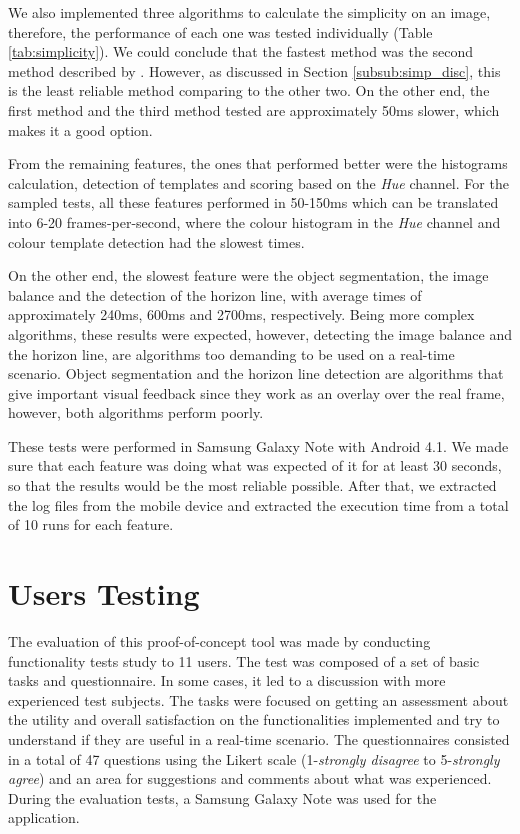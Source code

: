 We also implemented three algorithms to calculate the simplicity on an image, therefore, the performance of each one was tested individually (Table \ref{tab:simplicity}). We could conclude that the fastest method was the second method described by \citeauthor{kaoautomatic} \cite{kaoautomatic}. However, as discussed in Section \ref{subsub:simp_disc}, this is the least reliable method comparing to the other two. On the other end, the first method \cite{luo2008photo} and the third method \cite{ke2006design} tested are approximately 50ms slower, which makes it a good option.

From the remaining features, the ones that performed better were the histograms calculation, detection of templates and scoring based on the \emph{Hue} channel. For the sampled tests, all these features performed in 50-150ms which can be translated into 6-20 frames-per-second, where the colour histogram in the \emph{Hue} channel and colour template detection had the slowest times. 

On the other end, the slowest feature were the object segmentation, the image balance and the detection of the horizon line, with average times of approximately 240ms, 600ms and 2700ms, respectively. Being more complex algorithms, these results were expected, however, detecting the image balance and the horizon line, are algorithms too demanding to be used on a real-time scenario. Object segmentation and the horizon line detection are algorithms that give important visual feedback since they work as an overlay over the real frame, however, both algorithms perform poorly.

These tests were performed in Samsung Galaxy Note with Android 4.1. We made sure that each feature was doing what was expected of it for at least 30 seconds, so that the results would be the most reliable possible. After that, we extracted the log files from the mobile device and extracted the execution time from a total of 10 runs for each feature.
 
\section{Users Testing}

The evaluation of this proof-of-concept tool was made by conducting functionality tests study to 11 users. The test was composed of a set of basic tasks and questionnaire. In some cases, it led to a discussion with more experienced test subjects. The tasks were focused on getting an assessment about the utility and overall satisfaction on the functionalities implemented and try to understand if they are useful in a real-time scenario. The questionnaires consisted in a total of 47 questions using the Likert scale (1-\emph{strongly disagree} to 5-\emph{strongly agree}) and an area for suggestions and comments about what was experienced. During the evaluation tests, a Samsung Galaxy Note was used for the application.

